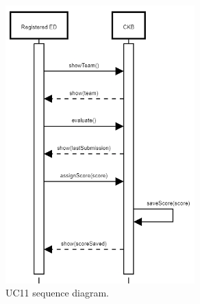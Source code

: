 \begin{center}
  \begin{figure} [H]
    \begin{center}
        \includegraphics[width=0.65\textwidth,height=\textheight,keepaspectratio]{Images/UseCaseDiagrams/UC11.png}
        \caption{UC11 sequence diagram.}
        \label{fig: UC11_sequence_diagram}
    \end{center}
  \end{figure}
\end{center}

